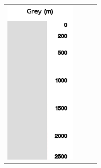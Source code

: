 \documentclass[a4paper,12pt]{refrep}
\begin{document}
\begin{maxipage}
\begin{longtable}{c c c c}
\includegraphics[angle=0,width=3.5cm,keepaspectratio='true']{figures/ramp-terrain-grey.png}
\\


\end{longtable}
\end{maxipage}
\end{document}
